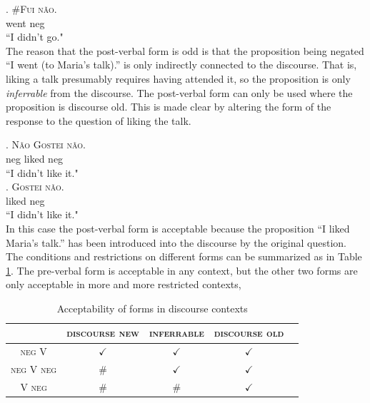\documentclass[12pt]{upenndiss}
\theoremstyle{definition} \newtheorem{definition}{Definition}
\begin{document}
\exg. \#\textsc{\color{green}Fui} \textsc{\color{green}n{\~a}o}.\\
	  went neg\\
	 ``I didn't go."\\

The reason that the post-verbal form is odd is that the proposition being negated ``I went (to Maria's talk).'' is only indirectly connected to the discourse. That is, liking a talk presumably requires having attended it, so the proposition is only \emph{inferrable} from the discourse. The post-verbal form can only be used where the proposition is discourse old. This is made clear by altering the form of the response to the question of liking the talk.

\exg. \textsc{\color{blue}N{\~a}o} \textsc{\color{blue}Gostei} \textsc{\color{blue}n{\~a}o}.\\
	 neg liked neg\\
	 ``I didn't like it."\\

\exg. \textsc{\color{green}Gostei} \textsc{\color{green}n{\~a}o}.\\
	  liked neg\\
	 ``I didn't like it."\\

In this case the post-verbal form is acceptable because the proposition ``I liked Maria's talk.'' has been introduced into the discourse by the original question. The conditions and restrictions on different forms can be summarized as in Table \ref{schwenter}. The pre-verbal form is acceptable in any context, but the other two forms are only acceptable in more and more restricted contexts,

\begin{table}
\begin{center}
\begin{tabular}{@{}ccccc@{}}
      \hline
       & \textsc{discourse new} & \textsc{inferrable} & \textsc{discourse old}\\ \hline
      \textsc{\color{red} neg V} & $\checkmark$ &  $\checkmark$ &  $\checkmark$ \\
      \textsc{\color{blue} neg V neg} & \#  & $\checkmark$ & $\checkmark$ \\
      \textsc{\color{green} V neg} & \#  & \#  & $\checkmark$ \\
      \hline
\end{tabular}     
\end{center}
\caption{Acceptability of forms in discourse contexts}     
\label{schwenter}
\end{table}
\end{document}
